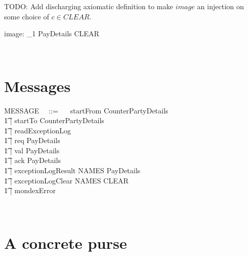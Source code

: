 %
TODO: Add discharging axiomatic definition to make
$image$ an injection on some choice of $c \in CLEAR$.
%
\begin{LADef}
\begin{axdef}
   image: \power_1 PayDetails \inj CLEAR
\end{axdef}~\end{LADef}

\section{Messages}

\begin{LFType}
\begin{zed}
   MESSAGE ~~::= ~~ startFrom \ldata CounterPartyDetails \rdata \\
           \t1 | startTo \ldata CounterPartyDetails \rdata \\
           \t1 | readExceptionLog \\
           \t1 | req \ldata PayDetails \rdata \\
           \t1 | val \ldata PayDetails \rdata \\
           \t1 | ack \ldata PayDetails \rdata \\
           \t1 | exceptionLogResult \ldata NAMES \cross PayDetails \rdata \\
           \t1 | exceptionLogClear \ldata NAMES \cross CLEAR \rdata \\
           \t1 | mondexError
\end{zed}~\end{LFType}

\section{A concrete purse}

